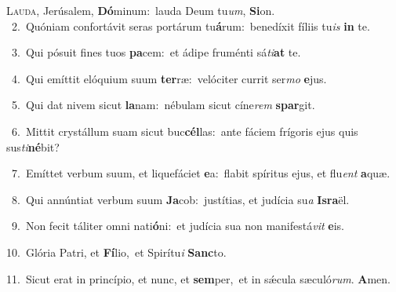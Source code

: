 \lettrine{\initial\textcolor{\initialcolor}{L}}{auda,} Jerúsalem, \textbf{Dó}\-minum:~\star lauda Deum tu\-\textit{um}\-, \textbf{Si}\-on.\\
{\numbfont\textcolor{\numbcolor}{~2.}}~Quóniam confortávit seras portárum tu\-\textbf{á}\-rum:~\star benedíxit fíliis tu\textit{is} \textbf{in} te.\par
{\numbfont\textcolor{\numbcolor}{~3.}}~Qui pósuit fines tuos \textbf{pa}\-cem:~\star et ádipe fruménti sá\-\textit{ti}\-\textbf{at} te.\par
{\numbfont\textcolor{\numbcolor}{~4.}}~Qui emíttit elóquium suum \textbf{ter}\-ræ:~\star velóciter currit ser\textit{mo} \textbf{e}\-jus.\par
{\numbfont\textcolor{\numbcolor}{~5.}}~Qui dat nivem sicut \textbf{la}\-nam:~\star nébulam sicut cíne\textit{rem} \textbf{spar}\-git.\par
{\numbfont\textcolor{\numbcolor}{~6.}}~Mittit crystállum suam sicut buc\-\textbf{cél}\-las:~\star ante fáciem frígoris ejus quis sus\-\textit{ti}\-\textbf{né}bit?\par
{\numbfont\textcolor{\numbcolor}{~7.}}~Emíttet verbum suum, et liquefáciet \textbf{e}\-a:~\star flabit spíritus ejus, et flu\textit{ent} \textbf{a}\-quæ.\par
{\numbfont\textcolor{\numbcolor}{~8.}}~Qui annúntiat verbum suum \textbf{Ja}\-cob:~\star justítias, et judícia su\textit{a} \textbf{Is}\-\textbf{ra}ël.\par
{\numbfont\textcolor{\numbcolor}{~9.}}~Non fecit táliter omni nati\-\textbf{ó}\-ni:~\star et judícia sua non manifestá\textit{vit} \textbf{e}\-is.\par
{\numbfont\textcolor{\numbcolor}{10.}}~Glória Patri, et \textbf{Fí}\-lio,~\star et Spirítu\textit{i} \textbf{Sanc}\-to.\par
{\numbfont\textcolor{\numbcolor}{11.}}~Sicut erat in princípio, et nunc, et \textbf{sem}\-per,~\star et in sǽcula sæculó\-\textit{rum}\-. \textbf{A}\-men.\par
